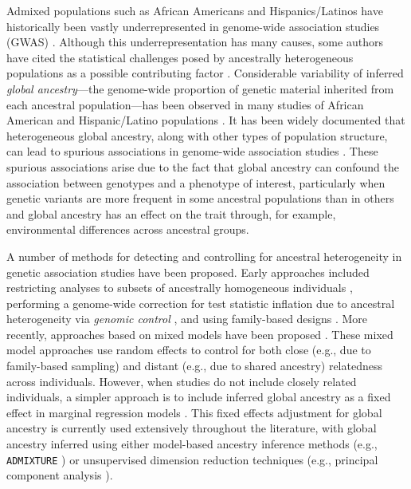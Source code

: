 \documentclass[12pt]{article}
\begin{document}
Admixed populations such as African Americans and Hispanics/Latinos have historically been vastly underrepresented in genome-wide association studies (GWAS) \cite{need2009, bustamante2011, popejoy2016, morales2018, sirugo2019, martin2019}. 
Although this underrepresentation has many causes, some authors have cited the statistical challenges posed by ancestrally heterogeneous populations as a possible contributing factor \citep{need2009, bustamante2011, popejoy2016}. 
Considerable variability of inferred \textit{global ancestry}---the genome-wide proportion of genetic material inherited from each ancestral population---has been observed in many studies of African American and Hispanic/Latino populations \citep{parra1998, tishkoff2009, bryc2010aa, bryc2010hl, conomos2016}.
It has been widely documented that heterogeneous global ancestry, along with other types of population structure, can lead to spurious associations in genome-wide association studies \citep{GenomicControl, eigenstrat, marchini2004, price2010}. 
These spurious associations arise due to the fact that global ancestry can confound the association between genotypes and a phenotype of interest, particularly when genetic variants are more frequent in some ancestral populations than in others  and global ancestry has an effect on the trait through, for example, environmental differences across ancestral groups. 

A number of methods for detecting and controlling for ancestral heterogeneity in genetic association studies have been proposed. 
Early approaches included restricting analyses to subsets of ancestrally homogeneous individuals \citep{lander1994}, performing a genome-wide correction for test statistic inflation due to ancestral heterogeneity via \textit{genomic control} \citep{GenomicControl}, and using family-based designs \citep{tdt}. 
More recently, approaches based on mixed models have been proposed \citep{yu2006, kang2010, yang2014}. 
These mixed model approaches use random effects to control for both close (e.g., due to family-based sampling) and distant (e.g., due to shared ancestry) relatedness across individuals.
However, when studies do not include closely related individuals, a simpler approach is to include inferred global ancestry as a fixed effect in marginal regression models \citep{eigenstrat, pritchard2000}. 
This fixed effects adjustment for global ancestry is currently used extensively throughout the literature, with global ancestry inferred using either model-based ancestry inference methods (e.g., \texttt{ADMIXTURE} \citep{admixture}) or unsupervised dimension reduction techniques (e.g., principal component analysis \citep{eigenstrat}).
\end{document}
